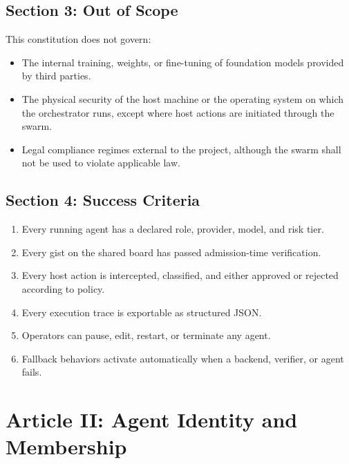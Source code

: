 \documentclass[12pt,letterpaper]{article}
\begin{document}
\subsection{Section 3: Out of Scope}

This constitution does not govern:

\begin{itemize}
    \item The internal training, weights, or fine-tuning of foundation models provided by third parties.
    \item The physical security of the host machine or the operating system on which the orchestrator runs, except where host actions are initiated through the swarm.
    \item Legal compliance regimes external to the project, although the swarm shall not be used to violate applicable law.
\end{itemize}

\subsection{Section 4: Success Criteria}

\begin{requirementbox}
\begin{enumerate}
    \item Every running agent has a declared role, provider, model, and risk tier.
    \item Every gist on the shared board has passed admission-time verification.
    \item Every host action is intercepted, classified, and either approved or rejected according to policy.
    \item Every execution trace is exportable as structured JSON.
    \item Operators can pause, edit, restart, or terminate any agent.
    \item Fallback behaviors activate automatically when a backend, verifier, or agent fails.
\end{enumerate}
\end{requirementbox}

\section{Article II: Agent Identity and Membership}
\label{art:identity}
\end{document}
